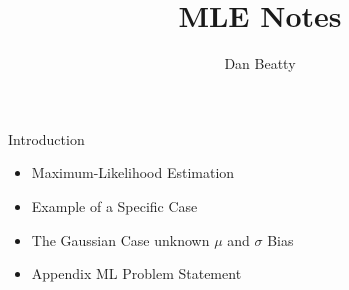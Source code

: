 \documentclass[11pt]{article}
\title{MLE Notes}
\author{Dan Beatty}
\begin{document}
\maketitle


Introduction
\begin{itemize}
	\item Maximum-Likelihood Estimation
	\item Example of a Specific Case
	\item The Gaussian Case unknown $\mu$ and $\sigma$ Bias
	\item  Appendix ML Problem Statement
\end{itemize}
\cite{duda-hart-stork}
\end{document}
